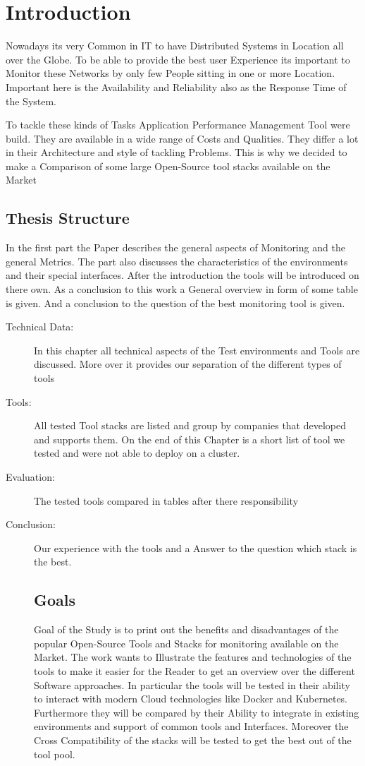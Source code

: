 
\chapter{Introduction}
Nowadays its very Common in IT to have Distributed Systems in Location all over the Globe. To be able to provide the best user Experience its important to Monitor these Networks by only few People sitting in one or more Location. Important here is the Availability and Reliability also as the Response Time of the System. 

To tackle these kinds of Tasks Application Performance Management Tool were build. They are available in a wide range of Costs and Qualities. They differ a lot in their Architecture and style of tackling Problems. This is why we decided to make a Comparison of some large Open-Source tool stacks available on the Market 


\section*{Thesis Structure}
In the first part the Paper describes the general aspects of Monitoring and the general Metrics. The part also discusses the characteristics of the environments and their special interfaces. After the introduction the tools will be introduced on there own. As a conclusion to this work a General overview in form of some table is given. And a conclusion to the question of the best monitoring tool is given. 
\begin{description}
\item[Technical Data:] In this chapter all technical aspects of the Test environments and Tools are discussed. More over it provides our separation of the different types of tools 
\item[Tools:] All tested Tool stacks are listed and group by companies that developed and supports them. On the end of this Chapter is a short list of tool we tested and were not able to deploy on a cluster.
\item[Evaluation:]The tested tools compared in tables after there responsibility 
\item[Conclusion:] Our experience with the tools and a Answer to the question which stack is the best.
\section*{Goals}
Goal of the Study is to print out the benefits and disadvantages of the popular Open-Source Tools and Stacks  for monitoring available on the Market. The work wants to Illustrate the features and technologies of the tools to make it easier for the Reader to get an overview over the different Software approaches. In particular the tools will be tested in their ability to interact with modern Cloud technologies like Docker and Kubernetes. Furthermore they will be compared by their Ability to integrate in existing environments and support of common tools and Interfaces. Moreover the Cross Compatibility of the stacks will be tested to get the best out of the tool pool.
\end{description}
